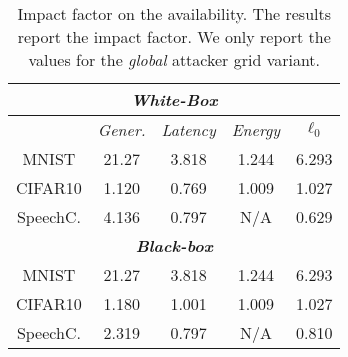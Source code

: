 \begin{table}[!htpb]
\centering
\footnotesize
\caption{Impact factor on the availability. The results report the impact factor. We only report the values for the \textit{global} attacker grid variant. }
\begin{tabular}{c|c|c|c|c}  \toprule
\multicolumn{5}{c}{\textit{\textbf{White-Box}}} \\ \midrule
 &\textit{Gener.} & \textit{Latency} & \textit{Energy} & \textit{$\ell_0$} \\ \midrule
MNIST  & 21.27 & 3.818 & 1.244 & 6.293 \\
CIFAR10 & 1.120 & 0.769 & 1.009 & 1.027 \\
SpeechC. & 4.136 & 0.797 & N/A & 0.629 \\ \midrule
\multicolumn{5}{c}{\textit{\textbf{Black-box}}} \\ \midrule
MNIST  & 21.27 & 3.818 & 1.244 & 6.293 \\
CIFAR10 & 1.180 & 1.001 & 1.009 & 1.027 \\
SpeechC. & 2.319 & 0.797 & N/A & 0.810 \\ \bottomrule
\end{tabular}
\label{tab.impact}
\end{table}

